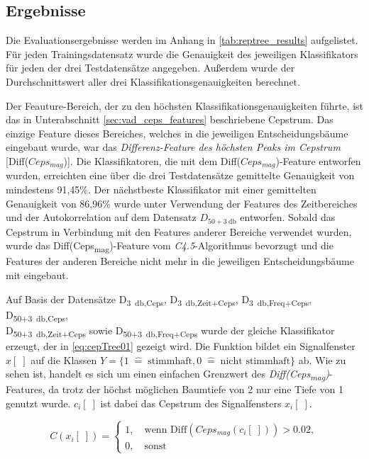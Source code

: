 \subsection{Ergebnisse}
\label{sec:vad_results}

Die Evaluationsergebnisse werden im Anhang in \autoref{tab:reptree_results} aufgelistet. Für jeden Trainingsdatensatz wurde die Genauigkeit des jeweiligen Klassifikators für jeden der drei Testdatensätze angegeben. Außerdem wurde der Durchschnittswert aller drei Klassifikationsgenauigkeiten berechnet.

Der Feauture-Bereich, der zu den höchsten Klassifikationsgenauigkeiten führte, ist das in Unterabschnitt \ref{sec:vad_ceps_features} beschriebene Cepstrum. Das einzige Feature dieses Bereiches, welches in die jeweiligen Entscheidungsbäume eingebaut wurde, war das \emph{Differenz-Feature des höchsten Peaks im Cepstrum} [Diff($Ceps_{mag}$)]. Die Klassifikatoren, die mit dem Diff($Ceps_{mag}$)-Feature entworfen wurden, erreichten eine über die drei Testdatensätze gemittelte Genauigkeit von mindestens 91,45\%. Der nächstbeste Klassifikator mit einer gemittelten Genauigkeit von 86,96\% wurde unter Verwendung der Features des Zeitbereiches und der Autokorrelation auf dem Datensatz $D_{50+\SI{3}{\decibel}}$ entworfen. Sobald das Cepstrum in Verbindung mit den Features anderer Bereiche verwendet wurden, wurde das Diff(Ceps\textsubscript{mag})-Feature vom \emph{C4.5}-Algorithmus bevorzugt und die Features der anderen Bereiche nicht mehr in die jeweiligen Entscheidungsbäume mit eingebaut.

Auf Basis der Datensätze D\textsubscript{\SI{3}{\decibel},Ceps}, D\textsubscript{\SI{3}{\decibel},Zeit+Ceps}, D\textsubscript{\SI{3}{\decibel},Freq+Ceps}, D\textsubscript{50+\SI{3}{\decibel},Ceps}, \\ D\textsubscript{50+\SI{3}{\decibel},Zeit+Ceps} sowie D\textsubscript{50+\SI{3}{\decibel},Freq+Ceps} wurde der gleiche Klassifikator erzeugt, der in \autoref{eq:cepTree01} gezeigt wird. Die Funktion bildet ein Signalfenster $x[\;]$ auf die Klassen $Y = \{ 1 \; \hat{=} \; \text{stimmhaft}, 0 \; \hat{=} \; \text{nicht stimmhaft}\}$ ab. Wie zu sehen ist, handelt es sich um einen einfachen Grenzwert des \emph{Diff(Ceps\textsubscript{mag})}-Features, da trotz der höchst möglichen Baumtiefe von 2 nur eine Tiefe von 1 genutzt wurde. $c_i[\;]$ ist dabei das Cepstrum des Signalfensters $x_i[\;]$.

\begin{equation}
C(x_i[\;]) = \begin{cases}
1, \quad \text{wenn  Diff}(Ceps_{mag}(c_i[\;])) > 0.02, \\
0, \quad \text{sonst}
\end{cases}
\label{eq:cepTree01}
\end{equation}


